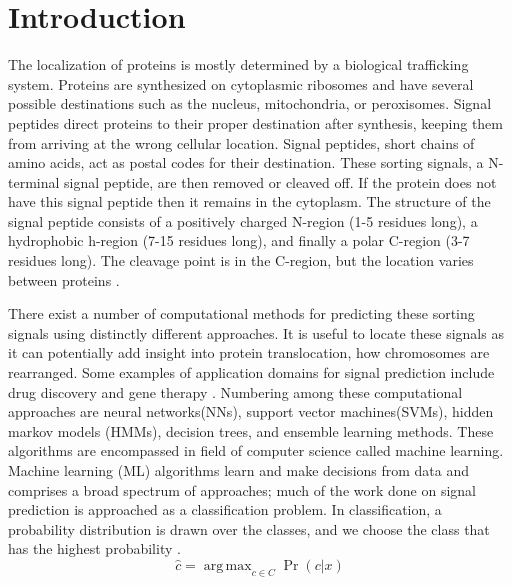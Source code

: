 \documentclass[10pt,letterpaper]{article}
\DeclareMathOperator*{\argmax}{arg\,max}
\begin{document}
	
	
	\linenumbers
	
	\section*{Introduction}
	The localization of proteins is mostly determined by a biological trafficking system. Proteins are synthesized on cytoplasmic ribosomes and have several possible destinations such as the nucleus, mitochondria, or peroxisomes. Signal peptides direct proteins to their proper destination after synthesis, keeping them from arriving at the wrong cellular location. Signal peptides, short chains of amino acids, act as postal codes for their destination. These sorting signals, a N-terminal signal peptide, are then removed or cleaved off. If the protein does not have this signal peptide then it remains in the cytoplasm. The structure of the signal peptide consists of a positively charged N-region (1-5 residues long), a hydrophobic h-region (7-15 residues long), and finally a polar C-region (3-7 residues long). The cleavage point is in the C-region, but the location varies between proteins \cite{thesis}. 
	
	There exist a number of computational methods for predicting these sorting signals using distinctly different approaches. It is useful to locate these signals as it can potentially add insight into protein translocation, how chromosomes are rearranged. Some examples of application domains for signal prediction include drug discovery and gene therapy \cite{thesis}. Numbering among these computational approaches are neural networks(NNs), support vector machines(SVMs), hidden markov models (HMMs), decision trees, and ensemble learning methods. These algorithms are encompassed in field of computer science called machine learning. Machine learning (ML) algorithms learn and make decisions from data and comprises a broad spectrum of approaches; much of the work done on signal prediction is approached as a classification problem. In classification, a probability distribution is drawn over the classes, and we choose the class that has the highest probability \cite{jurafsky}. $$ \hat{c} = \argmax_{c \in C}{ \Pr(c \vert x)} $$
	
\end{document}
